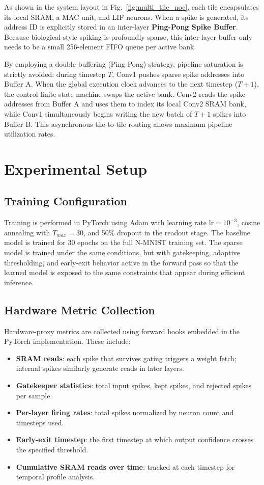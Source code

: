 \documentclass[conference]{IEEEtran}
\begin{document}
As shown in the system layout in Fig.~\ref{fig:multi_tile_noc}, each tile encapsulates its local SRAM, a MAC unit, and LIF neurons. When a spike is generated, its address ID is explicitly stored in an inter-layer \textbf{Ping-Pong Spike Buffer}. Because biological-style spiking is profoundly sparse, this inter-layer buffer only needs to be a small 256-element FIFO queue per active bank. 

By employing a double-buffering (Ping-Pong) strategy, pipeline saturation is strictly avoided: during timestep $T$, Conv1 pushes sparse spike addresses into Buffer A. When the global execution clock advances to the next timestep ($T+1$), the control finite state machine swaps the active bank. Conv2 reads the spike addresses from Buffer A and uses them to index its local Conv2 SRAM bank, while Conv1 simultaneously begins writing the new batch of $T+1$ spikes into Buffer B. This asynchronous tile-to-tile routing allows maximum pipeline utilization rates.

\section{Experimental Setup}

\subsection{Training Configuration}
Training is performed in PyTorch using Adam with learning rate $\text{lr}=10^{-3}$, cosine annealing with $T_{max}=30$, and 50\% dropout in the readout stage. The baseline model is trained for 30 epochs on the full N-MNIST training set. The sparse model is trained under the same conditions, but with gatekeeping, adaptive thresholding, and early-exit behavior active in the forward pass so that the learned model is exposed to the same constraints that appear during efficient inference.

\subsection{Hardware Metric Collection}
Hardware-proxy metrics are collected using forward hooks embedded in the PyTorch implementation. These include:
\begin{itemize}
    \item \textbf{SRAM reads}: each spike that survives gating triggers a weight fetch; internal spikes similarly generate reads in later layers.
    \item \textbf{Gatekeeper statistics}: total input spikes, kept spikes, and rejected spikes per sample.
    \item \textbf{Per-layer firing rates}: total spikes normalized by neuron count and timesteps used.
    \item \textbf{Early-exit timestep}: the first timestep at which output confidence crosses the specified threshold.
    \item \textbf{Cumulative SRAM reads over time}: tracked at each timestep for temporal profile analysis.
\end{itemize}
\end{document}

